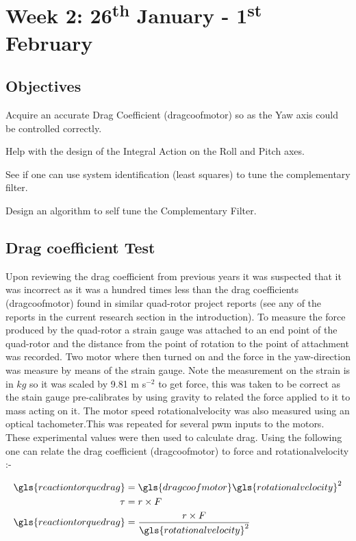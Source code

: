 \chapter{Week 2: 26\textsuperscript{th} January - 1\textsuperscript{st} February }
 \tocless\section{Objectives}


\begin{itemize*}
	\item Acquire an accurate Drag Coefficient (\gls{dragcoofmotor}) so as the Yaw axis could be controlled correctly.
	\item Help with the design of the Integral Action on the Roll and Pitch axes.
	\item See if one can use system identification (least squares) to tune the complementary filter.
	\item Design an algorithm to self tune the Complementary Filter.
\end{itemize*}


 \tocless\section{Drag coefficient Test}
Upon reviewing the drag coefficient from previous years it was suspected that it was incorrect as it was a hundred times less than the drag coefficients (\gls{dragcoofmotor}) found in similar quad-rotor project reports (see any of the reports in the current research section in the introduction).  To measure the force produced by the quad-rotor a strain gauge was attached to an end point of the quad-rotor and the distance from the point of rotation to the point of attachment was recorded. Two motor where then turned on and the force in the \gls{yaw}-direction was measure by means of the strain gauge. Note the measurement on the strain  is in $kg$ so it was scaled by 9.81 m s$^{-2}$ to get force, this was taken to be correct as the stain gauge pre-calibrates by using gravity to related the force applied to it to mass acting on it. The motor speed \gls{rotationalvelocity} was also measured using an optical tachometer.This was
repeated for several \gls{pwm} inputs to the motors. These experimental values were then
used to calculate drag. Using the following one can relate the drag coefficient (\gls{dragcoofmotor})  to force and \gls{rotationalvelocity} :-

\begin{align}
\begin{split}
\gls{reactiontorquedrag} &= \gls{dragcoofmotor}\gls{rotationalvelocity}^2 \\
\tau &= r \times F \\
\gls{reactiontorquedrag} &=\frac{r \times F}{\gls{rotationalvelocity}^2}
	\end{split}
	\end{align}

